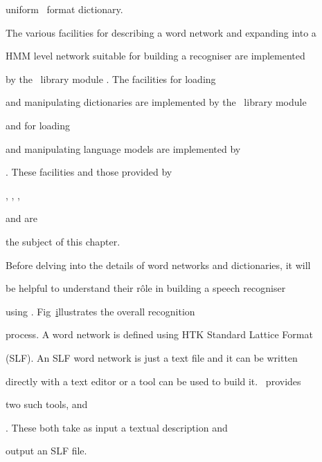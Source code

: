 uniform \HTK\ format dictionary.





The various facilities for describing a word network and expanding into a


HMM level network suitable for building a recogniser are implemented


by the \HTK\ library module .  The facilities for loading


and manipulating dictionaries are implemented by the \HTK\ library module


 and  for loading


and manipulating language models are implemented by


.  These facilities and those provided by 


, , , 


 and  are


the subject of this chapter.










Before delving into the details of word networks and dictionaries, it will


be helpful to understand their r\^{o}le in building a speech recogniser


using \HTK.  Fig~\href{f:recsys} illustrates the overall recognition


process.  A word network is defined using HTK Standard Lattice Format


(SLF).  An SLF word network is just a text file and it can be written


directly with a text editor or a tool can be used to build it. \HTK\ provides 


two such tools,  and


.  These both take as input a textual description and


output an SLF file. 








